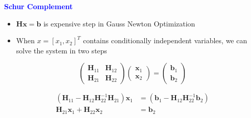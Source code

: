 \documentclass[aspectratio=169]{beamer}
\begin{document}
\begin{frame}{\textcolor{blue}{\textbf{Schur Complement}}}
	\vspace{-0.5cm}

	\begin{itemize}
			\item $\mathbf{H} \mathbf{x} = \mathbf{b}$ is expensive step in Gauss Newton Optimization
			\item When $x = \left[x_1, x_2\right]^T$ contains conditionally independent variables, we can solve the system in two steps
	\end{itemize}

	\begin{equation}
		\left(\begin{array}{ll}
		\mathbf{H}_{11} & \mathbf{H}_{12} \\
		\mathbf{H}_{21} & \mathbf{H}_{22}
		\end{array}\right)\left(\begin{array}{l}
		\mathbf{x}_1 \\
		\mathbf{x}_2
		\end{array}\right)=\left(\begin{array}{l}
		\mathbf{b}_1 \\
		\mathbf{b}_2
		\end{array}\right)
	\end{equation}

	\begin{equation}
		\begin{aligned}
			\left(\mathbf{H}_{11}-\mathbf{H}_{12} \mathbf{H}_{22}^{-1} \mathbf{H}_{21}\right) \mathbf{x}_1&=\left(\mathbf{b}_1-\mathbf{H}_{12} \mathbf{H}_{22}^{-1} \mathbf{b}_2\right)\\
			\mathbf{H}_{21} \mathbf{x}_1 + \mathbf{H}_{22} \mathbf{x}_2&=\mathbf{b}_2
		\end{aligned}
	\end{equation}

\end{frame}
\end{document}

